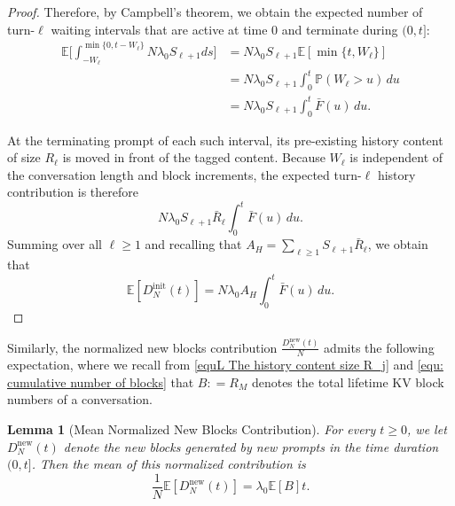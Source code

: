 \documentclass{article}
\newtheorem{lemma}[lemma]{Lemma}
\theoremstyle{definition}
\newcommand{\E}{\mathbb E}
\newcommand{\pro}{\mathbb P}
\newcommand{\newb}{\mathrm{new}}
\begin{document}
\begin{proof}
    Therefore, by Campbell's theorem, we obtain the expected number of turn-$\ell$ waiting intervals that are active at time $0$ and terminate during $(0,t]$:
    \begin{align*}
        \E \bigg[\int_{-W_\ell}^{\min\{0,t-W_\ell\}} N\lambda_0 S_{\ell+1} ds \bigg ] &=  N\lambda_0S_{\ell+1}\E[\min\{t,W_\ell\}]\\
        & =N\lambda_0S_{\ell+1}\int_0^t\pro(W_\ell>u)\,du \\&=N\lambda_0S_{\ell+1}\int_0^t\bar F(u)\,du.
    \end{align*}

    At the terminating prompt of each such interval, its pre-existing history content of size $R_\ell$ is moved in front of the tagged content. Because $W_\ell$ is independent of the conversation length and block increments, the expected turn-$\ell$ history contribution is therefore
    \begin{equation*}
        N\lambda_0S_{\ell+1}\bar R_\ell\int_0^t\bar F(u)\,du.
    \end{equation*}
    Summing over all  $\ell\geq1$ and recalling that $A_H=\sum_{\ell\geq1}S_{\ell+1}\bar R_\ell$, we obtain that
    \begin{equation*}
        \E[D_N^{\mathrm{init}}(t)] = N\lambda_0A_H\int_0^t\bar F(u)\,du.
    \end{equation*}
\end{proof}


Similarly, the normalized new blocks contribution $\frac{D_N^{\newb}(t)}{N}$ admits the following expectation, where we recall from \eqref{equL The history content size R_j} and \eqref{equ: cumulative number of blocks} that $B: = R_M$ denotes the total lifetime KV block numbers of a conversation.

\begin{lemma}[Mean Normalized New Blocks Contribution]
\label{lem: Mean New Blocks Contribution}
    For every $t\geq 0$, we let $D_N^{\newb}(t)$ denote the new blocks generated by new prompts in the time duration $(0,t]$. Then the mean of this normalized contribution is 
    \begin{equation}
        \label{equ: Mean New Blocks Contribution}
        \frac{1}{N}\E[D_N^{\newb}(t)] = \lambda_0\E[B]t.
    \end{equation}
\end{lemma}
\end{document}

